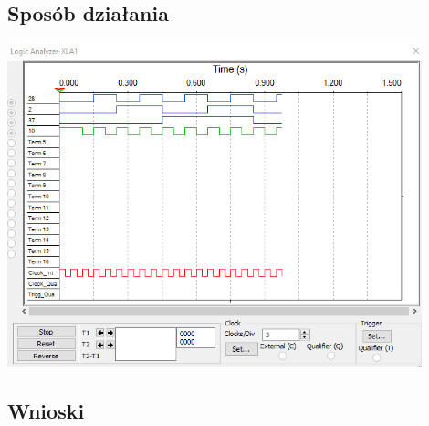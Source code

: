 \documentclass{article}
\begin{document}
        
        \subsection{Sposób działania}
            \begin{center}
                \includegraphics[width=12cm]{reports/img/Z3C_2.png}\\
            \end{center}
        
        \subsection{Wnioski}
            
\end{document}
